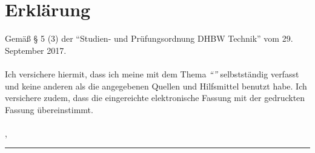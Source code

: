 
\chapter*{Erklärung}
Gemäß § 5 (3) der "`Studien- und Prüfungsordnung DHBW Technik"' vom 29. September 2017. \\
\\
Ich versichere hiermit, dass ich meine {\documentTypePhrase} mit dem Thema \textit{"`\documentTitle"'} selbstständig verfasst und keine anderen als die angegebenen Quellen und Hilfsmittel benutzt habe. Ich versichere zudem, dass die eingereichte elektronische Fassung mit der gedruckten Fassung übereinstimmt.\\
\\
\releaseLocation, \releaseDate
\vspace{2em}

\rule{6cm}{0.4pt}\\
\documentAuthor
